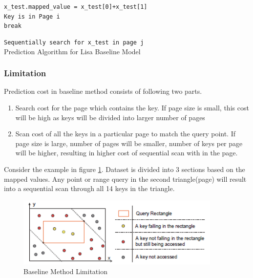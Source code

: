 \begin{algorithm}[H]
    \SetAlgoLined
    \texttt{x\_test.mapped\_value = x\_test[0]+x\_test[1] } \\
    {
        {
		    \texttt{Key is in Page i } \\
		    \texttt{break }
		}
    }
  
 	 \texttt{Sequentially search for x\_test in page j} \\
     \caption{Prediction Algorithm for Lisa Baseline Model }
\end{algorithm}

\subsubsection{Limitation}

Prediction cost in baseline method consists of following two parts.

\begin{enumerate}
	\item Search cost for the page which contains the key. If page size is small, this cost will be high as keys will be divided into larger number of pages
	\item Scan cost of all the keys in a particular page to match the query point. If page size is large, number of pages will be smaller, number of keys per page will be higher, resulting in higher cost of sequential scan with in the page. 
\end{enumerate}
Consider the example in figure \ref{fig:BaseLine_Method_Limitation}. Dataset is divided into 3 sections based on the mapped values. Any point or range query in the second triangle(page) will result into a sequential scan through all 14 keys in the triangle.   

\begin{figure}[t]
    \centering
    \includegraphics[width=0.9\textwidth]{graphs/Lisa_Baseline_Model_Limitation.png}
    \caption{Baseline Method Limitation }
    \label{fig:BaseLine_Method_Limitation}
\end{figure}

